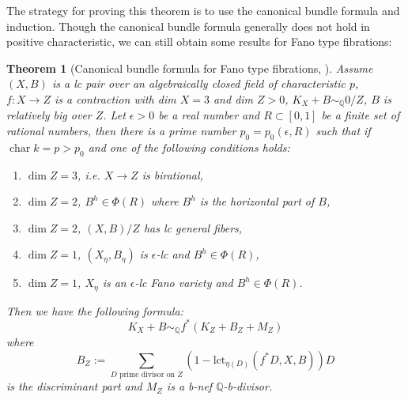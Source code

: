 \documentclass[letterpaper,reqno,12pt]{amsart}
\DeclareMathOperator{\chara}{char}
\numberwithin{equation}{section}
\theoremstyle{plain}
\newtheorem{theorem}{Theorem}[section]
\begin{document}
The strategy for proving this theorem is to use the canonical bundle formula and induction. Though the canonical bundle formula generally does not hold in positive characteristic, we can still obtain some results for Fano type fibrations:
\begin{theorem}[Canonical bundle formula for Fano type fibrations, ]
\label{cbf}
    Assume $(X,B)$ is a lc pair over an algebraically closed field of characteristic $p$, $f:X\to Z$ is a contraction with dim $X=3$ and dim $Z>0$, $K_X+B\sim_{\mathbb Q} 0/Z$, $B$ is relatively big over $Z$. Let $\epsilon>0$ be a real number and $R\subset [0,1]$ be a finite set of rational numbers, then there is a prime number $p_0=p_0(\epsilon,R)$ such that if $\chara k=p>p_0$ and one of the following conditions holds:
    \begin{enumerate}
        \item $\dim Z=3$, i.e. $X\to Z$ is birational,
        \item $\dim Z=2$, $B^{h}\in\Phi(R)$ where $B^h$ is the horizontal part of $B$,
        \item $\dim Z=2$, $(X,B)/Z$ has lc general fibers,
        \item $\dim Z=1$, $(X_\eta,B_\eta)$ is $\epsilon$-lc and $B^{h}\in\Phi(R)$,
        \item $\dim Z=1$, $X_\eta$ is an $\epsilon$-lc Fano variety and $B^h\in\Phi(R)$.
    \end{enumerate}
    Then we have the following formula:
    \[K_X+B\sim_{\mathbb Q} f^*(K_Z+B_Z+M_Z)\]
    where \[B_Z:=\sum_{D\text{ prime divisor on }Z}(1-\text{lct}_{\eta(D)}(f^*D,X,B))D\]
    is the discriminant part and $M_Z$ is a b-nef ${\mathbb Q}$-b-divisor.
\end{theorem}
\end{document}
